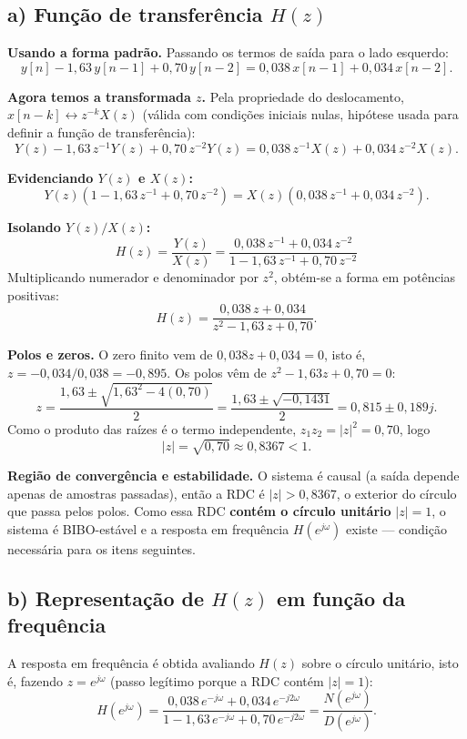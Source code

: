\documentclass[12pt]{article}
\begin{document}
\subsection*{a) Função de transferência $H(z)$}

\noindent\textbf{Usando a forma padrão.} Passando os termos de saída para o lado
esquerdo:
\[
y[n] - 1{,}63\,y[n-1] + 0{,}70\,y[n-2] = 0{,}038\,x[n-1] + 0{,}034\,x[n-2].
\]

\noindent\textbf{Agora temos a transformada $z$.} Pela propriedade do deslocamento,
$x[n-k] \leftrightarrow z^{-k}X(z)$ (válida com condições iniciais nulas, hipótese
usada para definir a função de transferência):
\[
Y(z) - 1{,}63\,z^{-1}Y(z) + 0{,}70\,z^{-2}Y(z)
 = 0{,}038\,z^{-1}X(z) + 0{,}034\,z^{-2}X(z).
\]

\noindent\textbf{Evidenciando $Y(z)$ e $X(z)$:}
\[
Y(z)\left(1 - 1{,}63\,z^{-1} + 0{,}70\,z^{-2}\right)
= X(z)\left(0{,}038\,z^{-1} + 0{,}034\,z^{-2}\right).
\]

\noindent\textbf{Isolando $Y(z)/X(z)$:}
\[
\boxed{
H(z) = \frac{Y(z)}{X(z)}
= \frac{0{,}038\,z^{-1} + 0{,}034\,z^{-2}}{1 - 1{,}63\,z^{-1} + 0{,}70\,z^{-2}}
}
\]
Multiplicando numerador e denominador por $z^{2}$, obtém-se a forma em potências
positivas:
\[
H(z) = \frac{0{,}038\,z + 0{,}034}{z^{2} - 1{,}63\,z + 0{,}70}.
\]

\noindent\textbf{Polos e zeros.} O zero finito vem de $0{,}038z + 0{,}034 = 0$, isto é,
$z = -0{,}034/0{,}038 = -0{,}895$. Os polos vêm de $z^{2} - 1{,}63z + 0{,}70 = 0$:
\[
z = \frac{1{,}63 \pm \sqrt{1{,}63^{2} - 4(0{,}70)}}{2}
  = \frac{1{,}63 \pm \sqrt{-0{,}1431}}{2}
  = 0{,}815 \pm 0{,}189j.
\]
Como o produto das raízes é o termo independente, $z_1 z_2 = |z|^2 = 0{,}70$, logo
\[
|z| = \sqrt{0{,}70} \approx 0{,}8367 < 1.
\]

\noindent\textbf{Região de convergência e estabilidade.} O sistema é causal (a saída
depende apenas de amostras passadas), então a RDC é $|z| > 0{,}8367$, o exterior do
círculo que passa pelos polos. Como essa RDC \textbf{contém o círculo unitário}
$|z| = 1$, o sistema é BIBO-estável e a resposta em frequência $H(e^{j\omega})$
existe --- condição necessária para os itens seguintes.

\subsection*{b) Representação de $H(z)$ em função da frequência}

A resposta em frequência é obtida avaliando $H(z)$ sobre o círculo unitário, isto é,
fazendo $z = e^{j\omega}$ (passo legítimo porque a RDC contém $|z| = 1$):
\[
H(e^{j\omega}) =
\frac{0{,}038\,e^{-j\omega} + 0{,}034\,e^{-j2\omega}}
     {1 - 1{,}63\,e^{-j\omega} + 0{,}70\,e^{-j2\omega}}
= \frac{N(e^{j\omega})}{D(e^{j\omega})}.
\]
\end{document}
